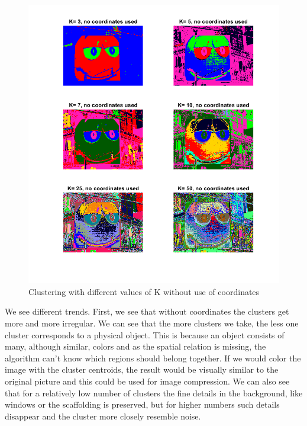 \begin{figure}[h!]
\centering
\includegraphics[width =0.8\linewidth]{figures/task2/mm_nocoords_manyK.png}
\caption{Clustering with different values of K without use of coordinates}
\label{fig:mm:nocoords:manyK}
\end{figure}

We see different trends. First, we see that without coordinates the clusters get more and more irregular. We can see that the more clusters we take, the less one cluster corresponds to a physical object. This is because an object consists of many, although similar, colors and as the spatial relation is missing, the algorithm can't know which regions should belong together. If we would color the image with the cluster centroids, the result would be visually similar to the original picture and this could be used for image compression. We can also see that for a relatively low number of clusters the fine details in the background, like windows or the scaffolding is preserved, but for higher numbers such details disappear and the cluster more closely resemble noise.

